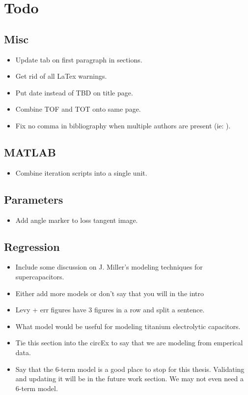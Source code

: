 \section{Todo}

\subsection{Misc}
\begin{itemize}
    \item Update tab on first paragraph in sections.
    \item Get rid of all LaTex warnings.
    \item Put date instead of TBD on title page.
    \item Combine TOF and TOT onto same page.
    \item Fix no comma in bibliography when multiple authors are present (ie: \cite{absCircuit}).
\end{itemize}

\subsection{MATLAB}
\begin{itemize}
    \item Combine iteration scripts into a single unit.
\end{itemize}

\subsection{Parameters}
\begin{itemize}
    \item Add angle marker to loss tangent image.
\end{itemize}

\subsection{Regression}
\begin{itemize}
    \item Include some discussion on J. Miller's modeling techniques for supercapacitors.
    \item Either add more models or don't say that you will in the intro
    \item Levy + err figures have 3 figures in a row and split a sentence.
    \item What model would be useful for modeling titanium electrolytic capacitors.
    \item Tie this section into the circEx to say that we are modeling from emperical data.
    \item Say that the 6-term model is a good place to stop for this thesis. Validating and updating it will be in the future work section. We may not even need a 6-term model.
\end{itemize}

